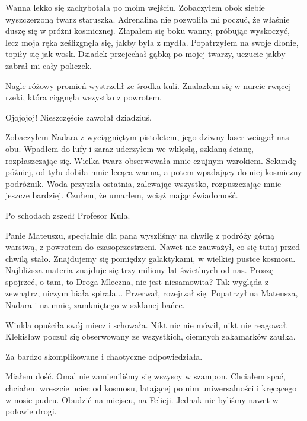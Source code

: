Wanna lekko się zachybotała po moim wejściu.
Zobaczyłem obok siebie wyszczerzoną twarz staruszka.
Adrenalina nie pozwoliła mi poczuć, że właśnie duszę się w próżni kosmicznej.
Złapałem się boku wanny, próbując wyskoczyć, lecz moja ręka ześlizgnęła się, jakby była z mydła.
Popatrzyłem na swoje dłonie, topiły się jak wosk.
Dziadek przejechał gąbką po mojej twarzy, uczucie jakby zabrał mi cały policzek.

Nagle różowy promień wystrzelił ze środka kuli.
Znalazłem się w nurcie rwącej rzeki, która ciągnęła wszystko z powrotem.
\begin{dialogue}
\ds{} Ojojojoj! Nieszczęście \dm{} zawołał dziadziuś.
\end{dialogue}
Zobaczyłem Nadara z wyciągniętym pistoletem, jego dziwny laser wciągał nas obu. Wpadłem do lufy i zaraz uderzyłem we wklęsłą, szklaną ścianę, rozpłaszczając się.
Wielka twarz obserwowała mnie czujnym wzrokiem.
Sekundę później, od tyłu dobiła mnie lecąca wanna, a potem wpadający do niej kosmiczny podróżnik.
Woda przyszła ostatnia, zalewając wszystko, rozpuszczając mnie jeszcze bardziej.
Czułem, że umarłem, wciąż mając świadomość.

Po schodach zszedł Profesor Kula.
\begin{dialogue}
\ds{} Panie Mateuszu, specjalnie dla pana wyszliśmy na chwilę z podróży górną warstwą, z powrotem do czasoprzestrzeni. \dm{} Nawet nie zauważył, co się tutaj przed chwilą stało.
\dm{} Znajdujemy się pomiędzy galaktykami,  w wielkiej pustce kosmosu. Najbliższa materia znajduje się trzy miliony lat świetlnych od nas. Proszę spojrzeć, 
o tam, to Droga Mleczna, nie jest niesamowita? Tak wygląda z zewnątrz, niczym biała spirala... \dm{} Przerwał, rozejrzał się. Popatrzył na Mateusza, Nadara i na mnie, zamkniętego w szklanej bańce.
\end{dialogue}

\divider{}

Winkla opuściła swój miecz i schowała. 
Nikt nic nie mówił, nikt nie reagował. 
Klekisław poczuł się obserwowany ze wszystkich, ciemnych zakamarków zaułka.
\begin{dialogue}
\ds{} Za bardzo skomplikowane i chaotyczne \dm{} odpowiedziała.
\end{dialogue}

\divider{}

Miałem dość. Omal nie zamieniliśmy się wszyscy w szampon.
Chciałem spać, chciałem wreszcie uciec od kosmosu, latającej po nim uniwersalności i kręcącego w nosie pudru.
Obudzić na miejscu, na Felicji.
Jednak nie byliśmy nawet w połowie drogi.

